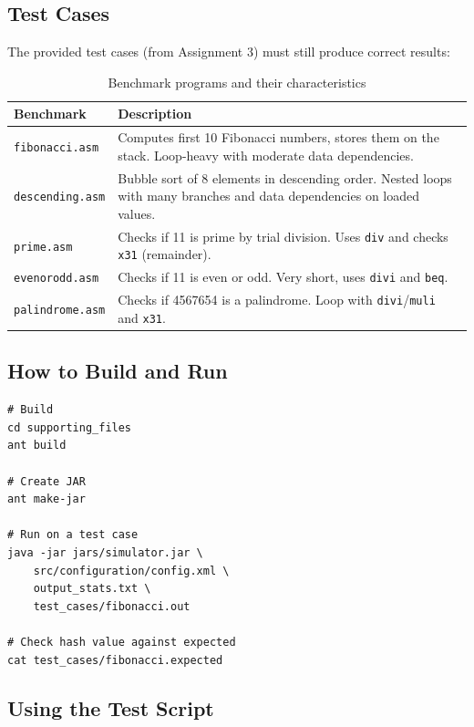 \documentclass[12pt,a4paper]{article}
\begin{document}
\subsection{Test Cases}

The provided test cases (from Assignment 3) must still produce correct results:

\begin{table}[H]
\centering
\begin{tabular}{@{}lp{8cm}@{}}
\toprule
\textbf{Benchmark} & \textbf{Description} \\
\midrule
\texttt{fibonacci.asm} & Computes first 10 Fibonacci numbers, stores them on the stack. Loop-heavy with moderate data dependencies. \\
\texttt{descending.asm} & Bubble sort of 8 elements in descending order. Nested loops with many branches and data dependencies on loaded values. \\
\texttt{prime.asm} & Checks if 11 is prime by trial division. Uses \texttt{div} and checks \texttt{x31} (remainder). \\
\texttt{evenorodd.asm} & Checks if 11 is even or odd. Very short, uses \texttt{divi} and \texttt{beq}. \\
\texttt{palindrome.asm} & Checks if 4567654 is a palindrome. Loop with \texttt{divi}/\texttt{muli} and \texttt{x31}. \\
\bottomrule
\end{tabular}
\caption{Benchmark programs and their characteristics}
\end{table}

\subsection{How to Build and Run}

\begin{lstlisting}[style=asmstyle, caption={Building and running the simulator}]
# Build
cd supporting_files
ant build

# Create JAR
ant make-jar

# Run on a test case
java -jar jars/simulator.jar \
    src/configuration/config.xml \
    output_stats.txt \
    test_cases/fibonacci.out

# Check hash value against expected
cat test_cases/fibonacci.expected
\end{lstlisting}

\subsection{Using the Test Script}
\end{document}
